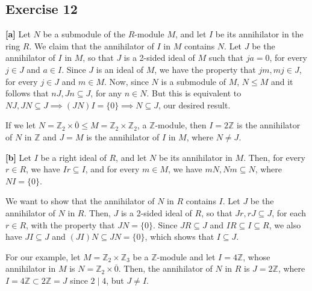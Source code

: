 \subsection*{Exercise 12}

\textbf{[a]} Let $N$ be a submodule of the $R$-module $M$, and let $I$ be its annihilator in the ring $R$. We claim that the annihilator of $I$ in $M$ contains $N$. Let $J$ be the annihilator of $I$ in $M$, so that $J$ is a 2-sided ideal of $M$ such that $ja = 0$, for every $j \in J$ and $a \in I$. Since $J$ is an ideal of $M$, we have the property that $jm, mj \in J$, for every $j \in J$ and $m \in M$. Now, since $N$ is a submodule of $M$, $N \le M$ and it follows that $nJ, Jn \subseteq J$, for any $n \in N$. But this is equivalent to $NJ,JN \subseteq J \implies (JN)I = \{0\} \implies N \subseteq J$, our desired result.

If we let $N = \mathbb{Z}_2 \times \overline{0} \le M = \mathbb{Z}_2 \times \mathbb{Z}_2$, a $\mathbb{Z}$-module, then $I = 2\mathbb{Z}$ is the annihilator of $N$ in $\mathbb{Z}$ and $J = M$ is the annihilator of $I$ in $M$, where $N \not= J$.

\vspace{5 mm}
\textbf{[b]} Let $I$ be a right ideal of $R$, and let $N$ be its annihilator in $M$. Then, for every $r \in R$, we have $Ir \subseteq I$, and for every $m \in M$, we have $mN, Nm \subseteq N$, where $NI = \{0\}$.

We want to show that the annihilator of $N$ in $R$ contains $I$. Let $J$ be the annihilator of $N$ in $R$. Then, $J$ is a 2-sided ideal of $R$, so that $Jr, rJ \subseteq J$, for each $r \in R$, with the property that $JN = \{0\}$. Since $JR \subseteq J$ and $IR \subseteq I \subseteq R$, we also have $JI \subseteq J$ and $(JI)N \subseteq JN = \{0\}$, which shows that $I \subseteq J$.

For our example, let $M = \mathbb{Z}_2 \times \mathbb{Z}_3$ be a $\mathbb{Z}$-module and let $I = 4\mathbb{Z}$, whose annihilator in $M$ is $N =  \mathbb{Z}_2 \times \overline{0}$. Then, the annihilator of $N$ in $R$ is $J = 2\mathbb{Z}$, where $I = 4\mathbb{Z} \subset 2\mathbb{Z} = J$ since $2 \mid 4$, but $J \not= I$.